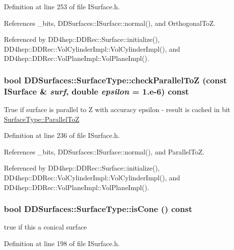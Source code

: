 Definition at line 253 of file ISurface.h.

References \_\-bits, DDSurfaces::ISurface::normal(), and OrthogonalToZ.

Referenced by DD4hep::DDRec::Surface::initialize(), DD4hep::DDRec::VolCylinderImpl::VolCylinderImpl(), and DD4hep::DDRec::VolPlaneImpl::VolPlaneImpl().\hypertarget{class_d_d_surfaces_1_1_surface_type_aaf82c50cdbb7f1f896995431da719003}{
\subsubsection[{checkParallelToZ}]{\setlength{\rightskip}{0pt plus 5cm}bool DDSurfaces::SurfaceType::checkParallelToZ (const {\bf ISurface} \& {\em surf}, \/  double {\em epsilon} = {\ttfamily 1.e-\/6}) const}}
\label{class_d_d_surfaces_1_1_surface_type_aaf82c50cdbb7f1f896995431da719003}
True if surface is parallel to Z with accuracy epsilon -\/ result is cached in bit \hyperlink{class_d_d_surfaces_1_1_surface_type_a2e946294c5368a34e227be2b17e73051aedf49a5300dce095439f45b9390faa5f}{SurfaceType::ParallelToZ} 

Definition at line 236 of file ISurface.h.

References \_\-bits, DDSurfaces::ISurface::normal(), and ParallelToZ.

Referenced by DD4hep::DDRec::Surface::initialize(), DD4hep::DDRec::VolCylinderImpl::VolCylinderImpl(), and DD4hep::DDRec::VolPlaneImpl::VolPlaneImpl().\hypertarget{class_d_d_surfaces_1_1_surface_type_ad19fbd07dae4be06196ed3eea391b7b5}{
\subsubsection[{isCone}]{\setlength{\rightskip}{0pt plus 5cm}bool DDSurfaces::SurfaceType::isCone () const}}
\label{class_d_d_surfaces_1_1_surface_type_ad19fbd07dae4be06196ed3eea391b7b5}


true if this a conical surface 

Definition at line 198 of file ISurface.h.

